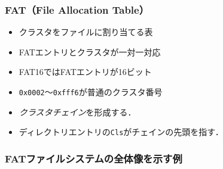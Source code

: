 \documentclass{beamer}                   %
\begin{document}
\begin{frame}
  \frametitle{FAT（File Allocation Table）}
  \vfill
  \begin{itemize}
  \item クラスタをファイルに割り当てる表
  \item FATエントリとクラスタが一対一対応
  \item FAT16ではFATエントリが16ビット
  \item \texttt{0x0002}〜\texttt{0xfff6}が普通のクラスタ番号
  \item \emph{クラスタチェイン}を形成する．
  \item ディレクトリエントリの\texttt{Cls}がチェインの先頭を指す．
  \end{itemize}
\end{frame}

\begin{frame}
  \frametitle{FATファイルシステムの全体像を示す例}
\end{frame}
\end{document}
